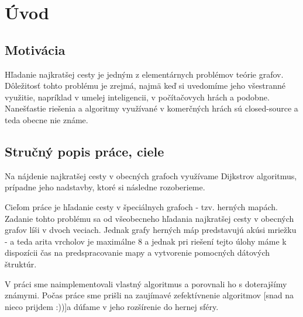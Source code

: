 \chapter*{Úvod}

\section{Motivácia}
Hľadanie najkratšej cesty je jedným z elementárnych problémov teórie grafov.
Dôležitosť tohto problému je zrejmá, najmä keď si uvedomíme jeho všestranné využitie, napríklad v 
umelej inteligencii, v počítačovych hrách a podobne. Nanešťastie riešenia a algoritmy využívané v komerčných hrách 
sú closed-source a teda obecne nie známe.

\section{Stručný popis práce, ciele}
Na nájdenie najkratšej cesty v obecných grafoch využívame Dijkstrov algoritmus, prípadne jeho nadstavby, ktoré si následne rozoberieme.

Cieľom práce je hľadanie cesty v špeciálnych grafoch - tzv. herných mapách. 
Zadanie tohto problému sa od všeobecneho hľadania najkratšej cesty v obecných grafov líši v dvoch veciach.
Jednak grafy herných máp predstavujú akúsi mriežku - a teda arita vrcholov je maximálne 8 a jednak pri riešení tejto úlohy máme k dispozícii čas
na predspracovanie mapy a vytvorenie pomocných dátových štruktúr.


V práci sme naimplementovali vlastný algoritmus a porovnali ho s doterajšímy známymi.
Počas práce sme prišli na zaujímavé zefektívnenie algoritmov [snad na nieco prijdem :))]a dúfame v jeho rozšírenie do hernej sféry.
